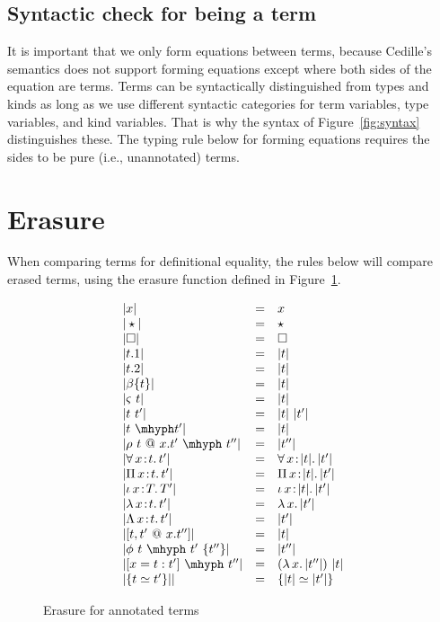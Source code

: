 \documentclass{article}
\newcommand{\abs}[4]{{#1}\, #2\! : \! #3.\, #4}
\newcommand{\absu}[3]{{#1}\, #2.\, #3}
\begin{document}
\subsection{Syntactic check for being a term}
\label{sec:termcheck}

It is important that we only form equations between terms, because
Cedille's semantics does not support forming equations except where
both sides of the equation are terms.  Terms can be syntactically
distinguished from types and kinds as long as we use different
syntactic categories for term variables, type variables, and kind
variables.  That is why the syntax of Figure~\ref{fig:syntax}
distinguishes these.  The typing rule below for forming equations
requires the sides to be pure (i.e., unannotated) terms.


\section{Erasure}

When comparing terms for definitional equality, the rules below will
compare erased terms, using the erasure function defined in
Figure~\ref{fig:eraser}.

\begin{figure}
  \[
  \begin{array}{lll}
    |x| & = & x \\
    |\star| & = & \star \\
    |\Box| & = & \Box \\
    |t.1| & = & |t| \\
    |t.2| & = & |t| \\
    |\beta\{t\}| & = & |t|\\
    |\varsigma\ t| & = & |t| \\
    |t\ t'| & = & |t|\ |t'| \\
    |t\ \mhyph t'| & = & |t| \\
    |\rho\ t\ @\ x.t'\ \mhyph\ t''| & = & |t''| \\
    |\abs{\forall}{x}{t}{t'}| & = & \abs{\forall}{x}{|t|}{|t'|}\\
    |\abs{\Pi}{x}{t}{t'}| & = & \abs{\Pi}{x}{|t|}{|t'|}\\
    |\abs{\iota}{x}{T}{T'}| & = & \abs{\iota}{x}{|t|}{|t'|} \\
    |\abs{\lambda}{x}{t}{t'}| & = &  \absu{\lambda}{x}{|t'|} \\
    |\abs{\Lambda}{x}{t}{t'}| & = &  |t'| \\ 
    |[ t , t' \ @\ x.t'' ]| & = & |t| \\ 
    |\phi\ t\ \mhyph\ t'\ \{t''\}| & = & |t''| \\
    |[ x = t : t' ]\ \mhyph\ t'' | & = & (\absu{\lambda}{x}{|t''|})\ |t|\\
    |\{ t \simeq t' \}|| & = & \{ |t| \simeq |t'| \}
  \end{array}
  \]
  \caption{Erasure for annotated terms}
  \label{fig:eraser}
\end{figure}  
\end{document}
